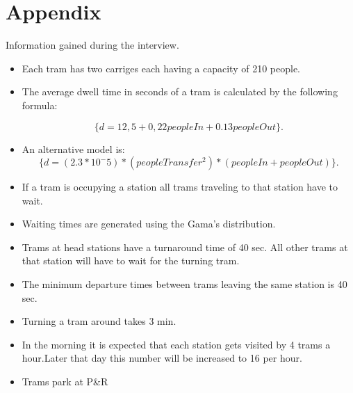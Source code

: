 \section{Appendix}

Information gained during the interview.

\begin{itemize}

	\item Each tram has two carriges each having a capacity of 210 people.
	
	\item The average dwell time in seconds of a tram is calculated by the 
	following formula:
	
	  \begin{equation}
	    \label{eq:eq1}
	    \{ d = 12,5 + 0,22 peopleIn + 0.13 peopleOut \}.
	  \end{equation}
	
	\item An alternative model is:
	  \begin{equation}
	    \label{eq:eq1}
	    \{ d = (2.3 * 10 ^ -5) * (peopleTransfer ^ 2) * (peopleIn + peopleOut) \}.
	  \end{equation}
	
	\item If a tram is occupying a station all trams traveling to that station 
	have to wait.
	
	\item Waiting times are generated using the Gama's distribution.
	
	\item Trams at head stations have a turnaround time of 40 sec. 
	All other trams at that station will have to wait for the turning tram.
	
	\item The minimum departure times between trams leaving the same station is 40 sec.
	
	\item Turning a tram around takes 3 min.
	
	\item In the morning it is expected that each station gets visited by 4 trams a hour.Later that day this number will be increased to 16 per hour.
	
	\item Trams park at P\&R

\end{itemize}